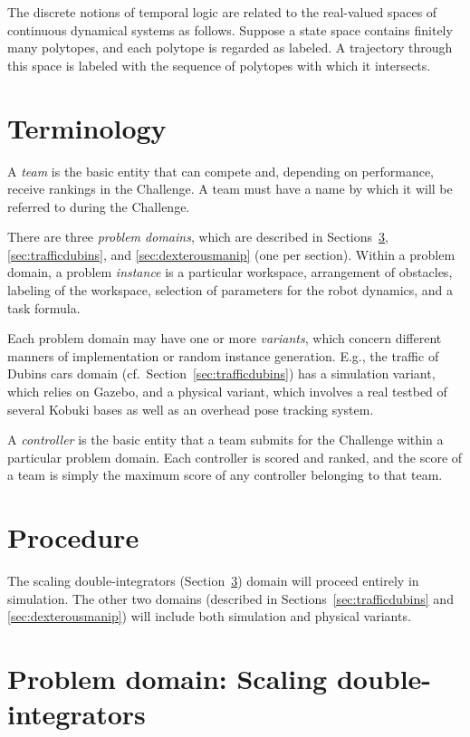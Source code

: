\documentclass{amsart}
\theoremstyle{definition}
\begin{document}
The discrete notions of temporal logic are related to the real-valued spaces of
continuous dynamical systems as follows.  Suppose a state space contains
finitely many polytopes, and each polytope is regarded as labeled.  A trajectory
through this space is labeled with the sequence of polytopes with which it
intersects.


\section{Terminology}

A \textit{team} is the basic entity that can compete and, depending on
performance, receive rankings in the Challenge.  A team must have a name by
which it will be referred to during the Challenge.

There are three \textit{problem domains}, which are described in
Sections~\ref{sec:scalingdoubleinteg}, \ref{sec:trafficdubins}, and
\ref{sec:dexterousmanip} (one per section).  Within a problem domain, a problem
\textit{instance} is a particular workspace, arrangement of obstacles, labeling
of the workspace, selection of parameters for the robot dynamics, and a task
formula.

Each problem domain may have one or more \textit{variants}, which concern
different manners of implementation or random instance generation.  E.g., the
traffic of Dubins cars domain (cf.\ Section~\ref{sec:trafficdubins}) has a
simulation variant, which relies on Gazebo, and a physical variant, which
involves a real testbed of several Kobuki bases as well as an overhead pose
tracking system.

A \textit{controller} is the basic entity that a team submits for the Challenge
within a particular problem domain.  Each controller is scored and ranked, and
the score of a team is simply the maximum score of any controller belonging to
that team.


\section{Procedure}

The scaling double-integrators (Section~\ref{sec:scalingdoubleinteg}) domain
will proceed entirely in simulation.  The other two domains (described in
Sections~\ref{sec:trafficdubins} and \ref{sec:dexterousmanip}) will include both
simulation and physical variants.


\section{Problem domain: Scaling double-integrators}\label{sec:scalingdoubleinteg}
\end{document}
